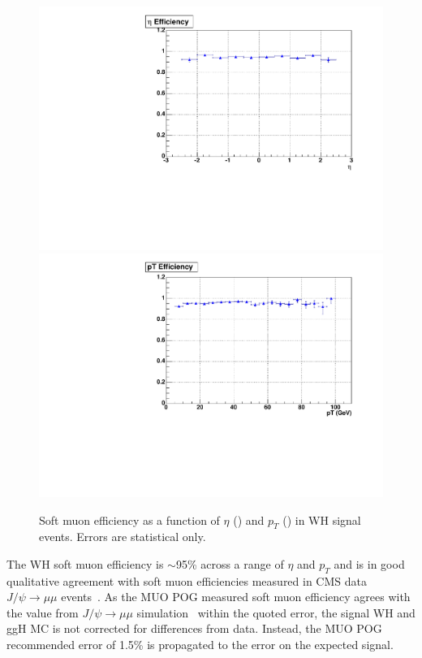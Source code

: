\begin{figure}[hbtp]
  \begin{center}
    \includegraphics[width=\cmsFigWidth]{figures/soft_eta_eff}
    \includegraphics[width=\cmsFigWidth]{figures/soft_pt_eff}
    \caption{Soft muon efficiency as a function of $\eta$ (\cmsLeft) and $p_T$ (\cmsRight) in WH signal events. Errors are statistical only.}
    \label{fig:soft_muon}
  \end{center}
\end{figure}

The WH soft muon efficiency is $\sim$95\% across a range of $\eta$ and $p_T$ and is in good qualitative agreement with soft muon efficiencies measured in CMS data $J\slash\psi\rightarrow\mu\mu$ events~\cite{1748-0221-7-10-P10002}.  As the MUO POG measured soft muon efficiency agrees with the value from $J\slash\psi\rightarrow\mu\mu$ simulation~\cite{CMS:muonrefeffstwiki} within the quoted error, the signal WH and ggH MC is not corrected for differences from data.  Instead, the MUO POG recommended error of 1.5\% is propagated to the error on the expected signal.

